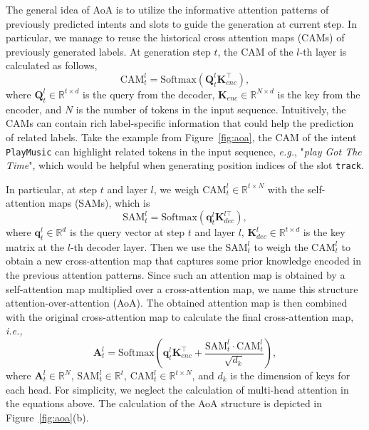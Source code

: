 \documentclass[11pt]{article}
\begin{document}
The general idea of AoA is to utilize the informative attention patterns of previously predicted intents and slots to guide the generation at current step. In particular, we manage to reuse the historical cross attention maps (CAMs) of previously generated labels. At generation step $t$, the CAM of the $l$-th layer is calculated as follows,
\begin{equation}
    \text{CAM}_t^l = \text{Softmax}(\mathbf{Q}_t^l\mathbf{K}_{enc}^{\top}),
\end{equation}
where $\mathbf{Q}_t^l\in\mathbb{R}^{t\times d}$ is the query from the decoder, $\mathbf{K}_{enc}\in\mathbb{R}^{N\times d}$ is the key from the encoder, and $N$ is the number of tokens in the input sequence. Intuitively, the CAMs can contain rich label-specific information that could help the prediction of related labels. Take the example from Figure~\ref{fig:aoa}, the CAM of the intent \texttt{PlayMusic} can highlight related tokens in the input sequence, \textit{e.g.}, "\emph{play Got The Time}", which would be helpful when generating position indices of the slot \texttt{track}.

In particular, at step $t$ and layer $l$, we weigh $\text{CAM}_t^l\in\mathbb{R}^{t\times N}$ with the self-attention maps (SAMs), which is 
\begin{equation}
    \text{SAM}_t^l = \text{Softmax}(\mathbf{q}_t^l\mathbf{K}_{dec}^{l\top}),
\end{equation}
where $\mathbf{q}_t^l\in\mathbb{R}^d$ is the query vector at step $t$ and layer $l$, $\mathbf{K}_{dec}^l\in\mathbb{R}^{t\times d}$ is the key matrix at the $l$-th decoder layer. Then we use the $\text{SAM}_t^l$ to weigh the $\text{CAM}_t^l$ to obtain a new cross-attention map that captures some prior knowledge encoded in the previous attention patterns. Since such an attention map is obtained by a self-attention map multiplied over a cross-attention map, we name this structure attention-over-attention (AoA). The obtained attention map is then combined with the original cross-attention map to calculate the final cross-attention map, \textit{i.e.,}
\begin{equation}
    \mathbf{A}_t^l = \text{Softmax}(\mathbf{q}_t^l\mathbf{K}_{enc}^{\top} + \frac{\text{SAM}_t^l\cdot\text{CAM}_t^l}{\sqrt{d_k}}),
\end{equation}
where $\mathbf{A}_t^l\in\mathbb{R}^{N}$, $\text{SAM}_t^l\in\mathbb{R}^t$, $\text{CAM}_t^l\in\mathbb{R}^{t\times N}$, and $d_k$ is the dimension of keys for each head. For simplicity, we neglect the calculation of multi-head attention in the equations above. The calculation of the AoA structure is depicted in Figure~\ref{fig:aoa}(b).
\end{document}
